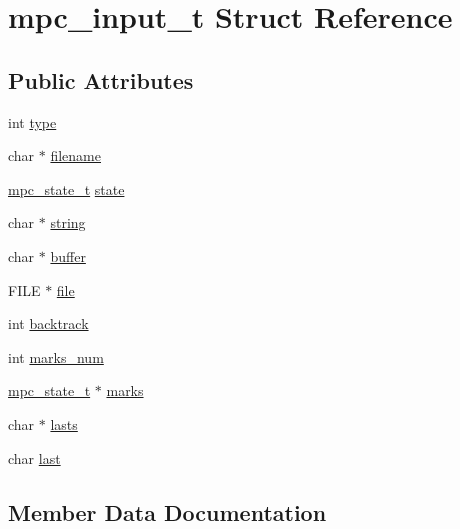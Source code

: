 \hypertarget{structmpc__input__t}{}\section{mpc\+\_\+input\+\_\+t Struct Reference}
\label{structmpc__input__t}
\subsection*{Public Attributes}
\begin{DoxyCompactItemize}
\item 
int \hyperlink{structmpc__input__t_a9ca0473884ea61afc16435149a5eb623}{type}
\item 
char $\ast$ \hyperlink{structmpc__input__t_a967ed629a019e01fd44098efaeb8edf8}{filename}
\item 
\hyperlink{structmpc__state__t}{mpc\+\_\+state\+\_\+t} \hyperlink{structmpc__input__t_ad8de1b39fcb16a6479adc4aa53e23065}{state}
\item 
char $\ast$ \hyperlink{structmpc__input__t_a74a9bfc4e939bd21670b658b881c3a7c}{string}
\item 
char $\ast$ \hyperlink{structmpc__input__t_a351c2ee3e5bde692018d3e0a1089d395}{buffer}
\item 
F\+I\+L\+E $\ast$ \hyperlink{structmpc__input__t_a0ee997a8a15240fb05e680ffec6ec521}{file}
\item 
int \hyperlink{structmpc__input__t_a4a215d6b53e4bc2d2deb9aed2a250465}{backtrack}
\item 
int \hyperlink{structmpc__input__t_adbdd1889942e95d169f5410c224dc092}{marks\+\_\+num}
\item 
\hyperlink{structmpc__state__t}{mpc\+\_\+state\+\_\+t} $\ast$ \hyperlink{structmpc__input__t_ace523453efb8a2042b8920a237991ab9}{marks}
\item 
char $\ast$ \hyperlink{structmpc__input__t_aedb1ba6d7f3948efe6f44106206a64a2}{lasts}
\item 
char \hyperlink{structmpc__input__t_af4bca4ced4b34e3f5c93a5f1f5a49c7d}{last}
\end{DoxyCompactItemize}


\subsection{Member Data Documentation}
\hypertarget{structmpc__input__t_a4a215d6b53e4bc2d2deb9aed2a250465}{}
